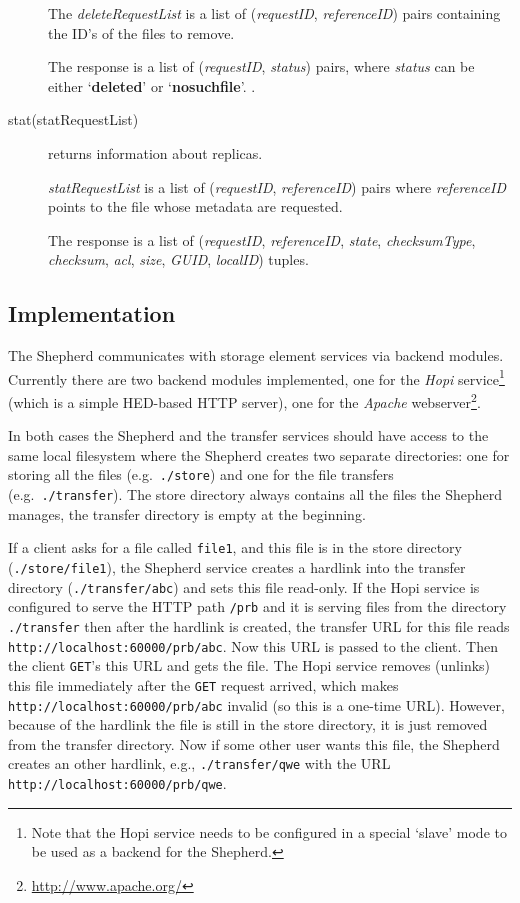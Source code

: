 \documentclass{book}
\begin{document}
\begin{description}
    The \emph{deleteRequestList} is a list of (\emph{requestID}, \emph{referenceID}) pairs containing the ID's of the files to remove.
    
    The response is a list of (\emph{requestID}, \emph{status}) pairs, where \emph{status} can be either `\textbf{deleted}' or `\textbf{nosuchfile}'.
    .
    \item[stat(statRequestList)] returns information about replicas.

    \emph{statRequestList} is a list of (\emph{requestID}, \emph{referenceID}) pairs where \emph{referenceID} points to the file whose metadata are requested. 
    
    The response is a list of (\emph{requestID}, \emph{referenceID}, \emph{state}, \emph{checksumType}, \emph{checksum}, \emph{acl}, \emph{size}, \emph{GUID}, \emph{localID}) tuples.
\end{description}


\subsection{Implementation} %
\label{sub:shepherd_implementation}

The Shepherd communicates with storage element services via backend modules. Currently there are two backend modules implemented, one for the \emph{Hopi} service\footnote{Note that the Hopi service needs to be configured in a special `slave' mode to be used as a backend for the Shepherd.} (which is a simple HED-based HTTP server), one for the \emph{Apache} webserver\footnote{\url{http://www.apache.org/}}.

In both cases the Shepherd and the transfer services should have access to the same local filesystem where the Shepherd creates two separate directories: one for storing all the files (e.g.~\verb!./store!) and one for the file transfers (e.g.~\verb!./transfer!). The store directory always contains all the files the Shepherd manages, the transfer directory is empty at the beginning.

If a client asks for a file called \verb!file1!, and this file is in the store directory (\verb!./store/file1!), the Shepherd service creates a hardlink into the transfer directory (\verb!./transfer/abc!) and sets this file read-only. If the Hopi service is configured to serve the HTTP path \verb!/prb! and it is serving files from the directory \verb!./transfer! then after the hardlink is created, the transfer URL for this file reads \verb!http://localhost:60000/prb/abc!. Now this URL is passed to the client. Then the client \verb!GET!'s this URL and gets the file. The Hopi service removes (unlinks) this file immediately after the \verb!GET! request arrived, which makes \verb!http://localhost:60000/prb/abc! invalid (so this is a one-time URL). However, because of the hardlink the file is still in the store directory, it is just removed from the transfer directory. Now if some other user wants this file, the Shepherd creates an other hardlink, e.g., \verb!./transfer/qwe! with the URL \verb!http://localhost:60000/prb/qwe!.
\end{document}
